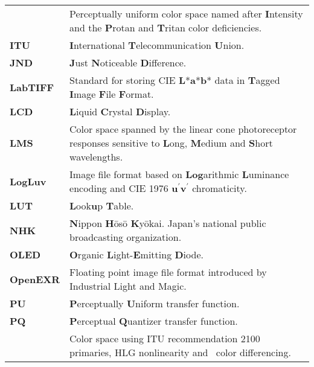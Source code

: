 \begin{flushleft}
\begin{longtable}[c]{@{}p{28.5mm}@{} p{120.5mm}}
	\textbf{\IPT}	& Perceptually uniform color space named after \textbf{I}ntensity and the \textbf{P}rotan and \textbf{T}ritan color deficiencies.\\
	\textbf{ITU}	& \textbf{I}nternational \textbf{T}elecommunication \textbf{U}nion.\\
	\textbf{JND}	& \textbf{J}ust \textbf{N}oticeable \textbf{D}ifference.\\
	\textbf{LabTIFF}& Standard for storing CIE \textbf{L}*\textbf{a}*\textbf{b}* data in \textbf{T}agged \textbf{I}mage \textbf{F}ile \textbf{F}ormat.\\
	\textbf{LCD}	& \textbf{L}iquid \textbf{C}rystal \textbf{D}isplay.\\
	\textbf{LMS}	& Color space spanned by the linear cone photoreceptor responses sensitive to \textbf{L}ong, \textbf{M}edium and \textbf{S}hort wavelengths.\\
	\textbf{LogLuv}	& Image file format based on \textbf{Log}arithmic \textbf{L}uminance encoding and CIE 1976 \textbf{u}$^\prime$\textbf{v}$^\prime$ chromaticity.\\
	\textbf{LUT}	& \textbf{L}ook\textbf{u}p \textbf{T}able.\\
	\textbf{NHK}    & \textbf{N}ippon \textbf{H}\={o}s\={o} \textbf{K}y\={o}kai. Japan's national public broadcasting organization.\\
	\textbf{OLED}	& \textbf{O}rganic \textbf{L}ight-\textbf{E}mitting \textbf{D}iode.\\
	\textbf{OpenEXR}& Floating point image file format introduced by Industrial Light and Magic.\\
	\textbf{PU}	    & \textbf{P}erceptually \textbf{U}niform transfer function.\\
	\textbf{PQ}	    & \textbf{P}erceptual \textbf{Q}uantizer transfer function.\\
	\textbf{\RecTTBBC}& Color space using ITU recommendation 2100 primaries, HLG nonlinearity and \YCbCr\ color differencing.\\

\end{longtable}
\end{flushleft}
